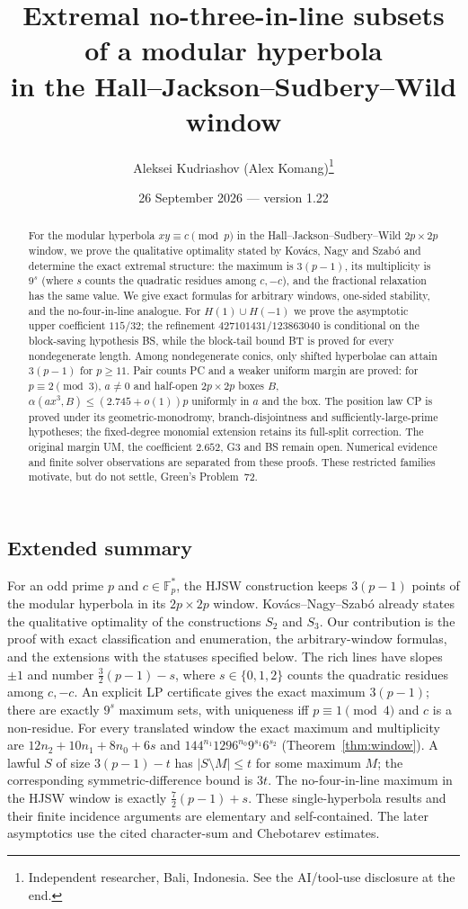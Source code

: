\documentclass[11pt]{article}
\title{Extremal no-three-in-line subsets of a modular hyperbola\\ in the Hall--Jackson--Sudbery--Wild window}
\author{Aleksei Kudriashov (Alex Komang)\thanks{Independent researcher, Bali, Indonesia.  See the AI/tool-use disclosure at the end.}}
\date{26 September 2026 --- version 1.22}
\theoremstyle{remark}
\newcommand{\Fp}{\mathbb{F}_p}
\begin{document}
\maketitle

\begin{abstract}
For the modular hyperbola $xy\equiv c\pmod p$ in the Hall--Jackson--Sudbery--Wild $2p\times2p$ window,
we prove the qualitative optimality stated by Kov\'acs, Nagy and Szab\'o and determine the exact extremal structure:
the maximum is $3(p-1)$, its multiplicity is $9^s$ (where $s$ counts the quadratic residues among $c,-c$), and the fractional relaxation has the same value.
We give exact formulas for arbitrary windows, one-sided stability, and the no-four-in-line analogue.
For $H(1)\cup H(-1)$ we prove the asymptotic upper coefficient $115/32$; the refinement $427101431/123863040$
is conditional on the block-saving hypothesis BS, while the block-tail bound BT is proved for every nondegenerate length.
Among nondegenerate conics, only shifted hyperbolae can attain $3(p-1)$ for $p\ge11$.
Pair counts PC and a weaker uniform margin are proved: for $p\equiv2\pmod3$, $a\ne0$ and half-open $2p\times2p$ boxes $B$,
$\alpha(ax^3,B)\le(2.745+o(1))p$ uniformly in $a$ and the box.
The position law CP is proved under its geometric-monodromy, branch-disjointness and sufficiently-large-prime hypotheses;
the fixed-degree monomial extension retains its full-split correction.
The original margin UM, the coefficient $2.652$, G3 and BS remain open.
Numerical evidence and finite solver observations are separated from these proofs.  These restricted families motivate, but do not settle, Green's Problem~72.
\end{abstract}

\subsection*{Extended summary}
For an odd prime $p$ and $c\in\Fp^*$, the HJSW construction keeps $3(p-1)$ points of the modular hyperbola in its $2p\times2p$ window.
Kov\'acs--Nagy--Szab\'o \cite[Appendix A]{KNS25} already states the qualitative optimality of the constructions $S_2$ and $S_3$.
Our contribution is the proof with exact classification and enumeration, the arbitrary-window formulas, and the extensions with the statuses specified below.
The rich lines have slopes $\pm1$ and number $\tfrac32(p-1)-s$, where $s\in\{0,1,2\}$ counts the quadratic residues among $c,-c$.
An explicit LP certificate gives the exact maximum $3(p-1)$; there are exactly $9^s$ maximum sets,
with uniqueness iff $p\equiv1\pmod4$ and $c$ is a non-residue.
For every translated window the exact maximum and multiplicity are
$12n_2+10n_1+8n_0+6s$ and $144^{n_1}1296^{n_0}9^{s_1}6^{s_2}$ (Theorem~\ref{thm:window}).
A lawful $S$ of size $3(p-1)-t$ has $|S\setminus M|\le t$ for some maximum $M$; the corresponding symmetric-difference bound is $3t$.
The no-four-in-line maximum in the HJSW window is exactly $\tfrac72(p-1)+s$.
These single-hyperbola results and their finite incidence arguments are elementary and self-contained.
The later asymptotics use the cited character-sum and Chebotarev estimates.
\end{document}
